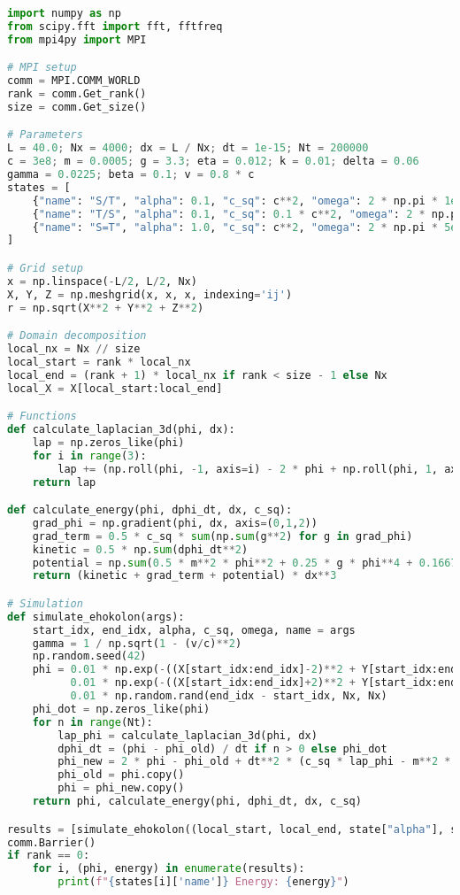 \documentclass[11pt]{article}
\begin{document}
\begin{lstlisting}[language=Python, caption={Fluxonic Time Dilation Simulation}, label=lst:simulation]
import numpy as np
from scipy.fft import fft, fftfreq
from mpi4py import MPI

# MPI setup
comm = MPI.COMM_WORLD
rank = comm.Get_rank()
size = comm.Get_size()

# Parameters
L = 40.0; Nx = 4000; dx = L / Nx; dt = 1e-15; Nt = 200000
c = 3e8; m = 0.0005; g = 3.3; eta = 0.012; k = 0.01; delta = 0.06
gamma = 0.0225; beta = 0.1; v = 0.8 * c
states = [
    {"name": "S/T", "alpha": 0.1, "c_sq": c**2, "omega": 2 * np.pi * 1e-4},
    {"name": "T/S", "alpha": 0.1, "c_sq": 0.1 * c**2, "omega": 2 * np.pi * 1e17},
    {"name": "S=T", "alpha": 1.0, "c_sq": c**2, "omega": 2 * np.pi * 5e14}
]

# Grid setup
x = np.linspace(-L/2, L/2, Nx)
X, Y, Z = np.meshgrid(x, x, x, indexing='ij')
r = np.sqrt(X**2 + Y**2 + Z**2)

# Domain decomposition
local_nx = Nx // size
local_start = rank * local_nx
local_end = (rank + 1) * local_nx if rank < size - 1 else Nx
local_X = X[local_start:local_end]

# Functions
def calculate_laplacian_3d(phi, dx):
    lap = np.zeros_like(phi)
    for i in range(3):
        lap += (np.roll(phi, -1, axis=i) - 2 * phi + np.roll(phi, 1, axis=i)) / dx**2
    return lap

def calculate_energy(phi, dphi_dt, dx, c_sq):
    grad_phi = np.gradient(phi, dx, axis=(0,1,2))
    grad_term = 0.5 * c_sq * sum(np.sum(g**2) for g in grad_phi)
    kinetic = 0.5 * np.sum(dphi_dt**2)
    potential = np.sum(0.5 * m**2 * phi**2 + 0.25 * g * phi**4 + 0.1667 * eta * phi**6)
    return (kinetic + grad_term + potential) * dx**3

# Simulation
def simulate_ehokolon(args):
    start_idx, end_idx, alpha, c_sq, omega, name = args
    gamma = 1 / np.sqrt(1 - (v/c)**2)
    np.random.seed(42)
    phi = 0.01 * np.exp(-((X[start_idx:end_idx]-2)**2 + Y[start_idx:end_idx]**2 + Z[start_idx:end_idx]**2)/0.1**2) * np.cos(5*X[start_idx:end_idx]) + \
          0.01 * np.exp(-((X[start_idx:end_idx]+2)**2 + Y[start_idx:end_idx]**2 + Z[start_idx:end_idx]**2)/0.1**2) * np.cos(5*X[start_idx:end_idx]) + \
          0.01 * np.random.rand(end_idx - start_idx, Nx, Nx)
    phi_dot = np.zeros_like(phi)
    for n in range(Nt):
        lap_phi = calculate_laplacian_3d(phi, dx)
        dphi_dt = (phi - phi_old) / dt if n > 0 else phi_dot
        phi_new = 2 * phi - phi_old + dt**2 * (c_sq * lap_phi - m**2 * phi - g * phi**3 - eta * phi**5 - alpha * phi * dphi_dt * np.gradient(phi, dx, axis=0) - delta * dphi_dt**2 * phi - gamma * phi + beta * np.cos(omega * n * dt) * phi + 8 * np.pi * G * k * phi**2)
        phi_old = phi.copy()
        phi = phi_new.copy()
    return phi, calculate_energy(phi, dphi_dt, dx, c_sq)

results = [simulate_ehokolon((local_start, local_end, state["alpha"], state["c_sq"], state["omega"], state["name"])) for state in states]
comm.Barrier()
if rank == 0:
    for i, (phi, energy) in enumerate(results):
        print(f"{states[i]['name']} Energy: {energy}")
\end{lstlisting}
\end{document}
